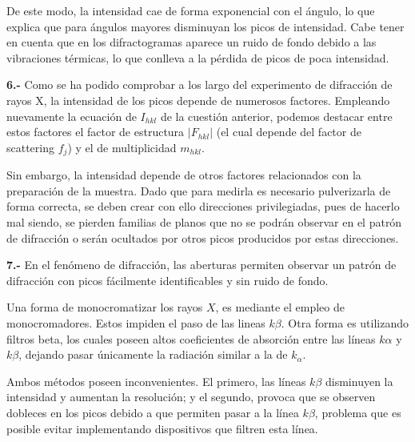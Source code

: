 \documentclass[a4paper,twocolumn,10pt]{article}
\begin{document}
De este modo, la intensidad cae de forma exponencial con el ángulo, lo que explica que para ángulos mayores disminuyan los picos de intensidad. Cabe tener en cuenta que en los difractogramas aparece un ruido de fondo debido a las vibraciones térmicas, lo que conlleva a la pérdida de picos de poca intensidad.

\textbf{6.-} Como se ha podido comprobar a los largo del experimento de difracción de rayos X, la intensidad de los picos depende de numerosos factores. Empleando nuevamente la ecuación de $I_{hkl}$ de la cuestión anterior, podemos destacar entre estos factores el factor de estructura $|F_{hkl}|$ (el cual depende del factor de scattering $f_j$) y el de multiplicidad $m_{hkl}$.

Sin embargo, la intensidad depende de otros factores relacionados con la preparación de la muestra. Dado que para medirla es necesario pulverizarla de forma correcta, se deben crear con ello direcciones privilegiadas, pues de hacerlo mal siendo, se pierden familias de planos que no se podrán observar en el patrón de difracción o serán ocultados por otros picos producidos por estas direcciones.

\textbf{7.-} En el fenómeno de difracción, las aberturas permiten observar un patrón de difracción con picos fácilmente identificables y sin ruido de fondo.

Una forma de monocromatizar los rayos $X$, es mediante el empleo de monocromadores. Estos impiden el paso de las lineas $k\beta$. Otra forma es utilizando filtros beta, los cuales poseen altos coeficientes de absorción entre las líneas $k\alpha$ y $k\beta$, dejando pasar únicamente la radiación similar a la de $k_{\alpha}$. 

Ambos métodos poseen inconvenientes. El primero, las líneas $k\beta$ disminuyen la intensidad y aumentan la resolución; y el segundo, provoca que se observen dobleces en los picos debido a que permiten pasar a la línea $k\beta$, problema que es posible evitar implementando dispositivos que filtren esta línea.




\end{document}
